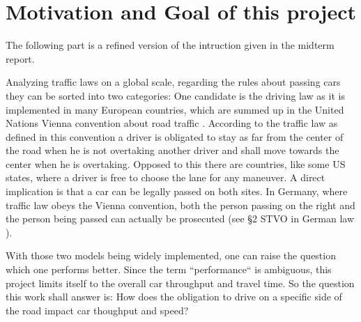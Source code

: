 \section{Motivation and Goal of this project}
\label{sec:goal}
The following part is a refined version of the intruction given in the midterm report.

Analyzing traffic laws on a global scale, regarding the rules about passing cars they can be sorted into two categories: One candidate
is the driving law as it is implemented in many European countries, which are summed up in the United
Nations Vienna convention about road traffic \cite{vienna-treaty}. According to the traffic law as defined in this
convention a driver is obligated to stay as far from the
center of the road when he is not overtaking another driver and shall move towards the center when he is overtaking.
Opposed to this there are countries, like some US states, where a driver is free to choose the lane for any maneuver.
A direct implication is that a car can be legally passed on both sites. In Germany, where traffic law obeys the Vienna
convention, both the person passing on the right and the person being passed can actually be prosecuted (see §2 STVO in 
German law \cite{STVO2}).

With those two models being widely implemented, one can raise the question which one performs better.
Since the term ``performance`` is ambiguous, this project limits itself to the overall car throughput and travel time. 
So the question this work shall answer is:
\newline
How does the obligation to drive on a specific side of the road impact car thoughput and speed?

